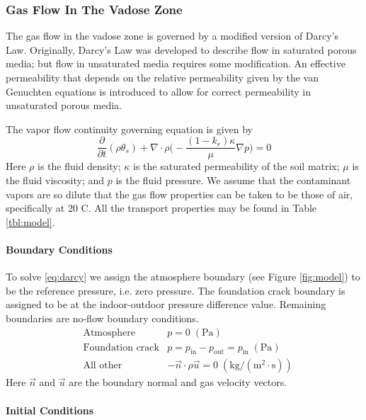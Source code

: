 \subsubsection{Gas Flow In The Vadose Zone}\label{sec:darcy}

The gas flow in the vadose zone is governed by a modified version of Darcy's Law.
Originally, Darcy's Law was developed to describe flow in saturated porous media; but flow in unsaturated media requires some modification\cite{c._w._fetter_contaminant_1993}.
An effective permeability that depends on the relative permeability given by the van Genuchten equations is introduced to allow for correct permeability in unsaturated porous media.\par

The vapor flow continuity governing equation is given by
\begin{equation}\label{eq:darcy}
  \frac{\partial}{\partial t} (\rho \theta_s) + \nabla \cdot \rho \Big( -\frac{(1-k_r) \kappa}{\mu} \nabla p \Big) = 0
\end{equation}
Here $\rho$ is the fluid density;
$\kappa$ is the saturated permeability of the soil matrix;
$\mu$ is the fluid viscosity; and $p$ is the fluid pressure.
We assume that the contaminant vapors are so dilute that the gas flow properties can be taken to be those of air, specifically at 20 \degree C.
All the transport properties may be found in Table \ref{tbl:model}.\par

\paragraph{Boundary Conditions}

To solve \eqref{eq:darcy} we assign the atmosphere boundary (see Figure \ref{fig:model}) to be the reference pressure, i.e. zero pressure.
The foundation crack boundary is assigned to be at the indoor-outdoor pressure difference value.
Remaining boundaries are no-flow boundary conditions.
\begin{align}
  &\text{Atmosphere} &p = 0 \; \mathrm{(Pa)} \\
  &\text{Foundation crack} &p = p_\mathrm{in} - p_\mathrm{out} = p_\mathrm{in} \; \mathrm{(Pa)} \\
  &\text{All other} &-\vec{n}\cdot\rho\vec{u} = 0 \; \mathrm{(kg/(m^2\cdot s))}
\end{align}
Here $\vec{n}$ and $\vec{u}$ are the boundary normal and gas velocity vectors.

\paragraph{Initial Conditions}

